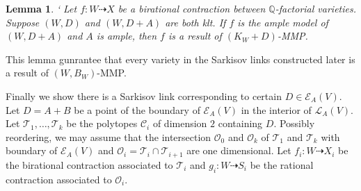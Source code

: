 \documentclass[11pt]{amsart}
\newtheorem{lem}[defn]{Lemma}
\begin{document}
\begin{lem}
`  \cite[Lemma 3.6]{haconSarkisovProgram2012} Let $f:W\dashrightarrow X $ be a birational contraction between $\mathbb{Q}$-factorial varieties. Suppose $(W,D)$ and $(W,D+A)$ are both klt. If $f$ is the ample model of $(W,D+A)$ and $A$ is ample, then $f$ is a result of  $(K_{W}+D)$-MMP.
\end{lem}

This lemma gunrantee that every variety in the Sarkisov links constructed later is a result of $(W,B_{W})$-MMP.

Finally we show there is a Sarkisov link corresponding to certain $D \in \mathcal{E}_{A}(V)$. Let $ D=A+B $ be a point of the boundary of $ \mathcal{E}_A(V) $ in the interior of $ \mathcal{L}_A(V) $. Let $ \mathcal{T}_1, \ldots, \mathcal{T}_k $ be the polytopes $ \mathcal{C}_i $ of dimension $ 2 $ containing $ D $. Possibly reordering, we may assume that  the intersection  $ \mathcal{O}_0 $ and $ \mathcal{O}_k $ of $ \mathcal{T}_1 $ and $ \mathcal{T}_k $ with boundary of $ \mathcal{E}_A(V) $ and  $ \mathcal{O}_i=\mathcal{T}_i\cap\mathcal{T}_{i+1} $ are one dimensional. Let $ f_i:W\dashrightarrow  X_i $ be the birational contraction associated to $ \mathcal{T}_i $ and $ g_i:W\dashrightarrow  S_i $ be the rational contraction associated to $ \mathcal{O}_i $.
\begin{center}
\end{center}
\end{document}
